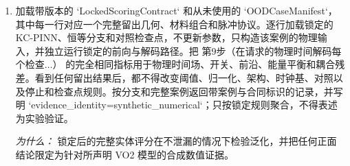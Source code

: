 \documentclass[10pt,a4paper]{article}
\begin{document}
\begin{enumerate}[leftmargin=*,start=7]
\par\emph{为什么：} 所有估计量都保持为物理时间泛函，而且任何正式分布外结果都不能影响模型或评估选择。
  \item 加载带版本的 `LockedScoringContract` 和从未使用的 `OODCaseManifest`，其中每一行对应一个完整留出几何、材料组合和脉冲协议。逐行加载锁定的 KC-PINN、恒等分支和对照检查点，不更新参数，只构造该案例的物理输入，并独立运行锁定的前向与解码路径。把 第9步（在请求的物理时间解码每个检查\(\dots \)） 的完全相同指标用于物理时间场、开关、前沿、能量平衡和耦合残差。看到任何留出结果后，都不得改变阈值、归一化、架构、时钟基、对照以及停止和检查点规则。按分支和完整案例返回带案例与合同标识的记录，并写明 `evidence\_identity=synthetic\_numerical`；只按锁定规则聚合，不得表述为实验验证。
\par\emph{为什么：} 锁定后的完整实体评分在不泄漏的情况下检验泛化，并把任何正面结论限定为针对所声明 VO2 模型的合成数值证据。
\end{enumerate}
\end{document}
